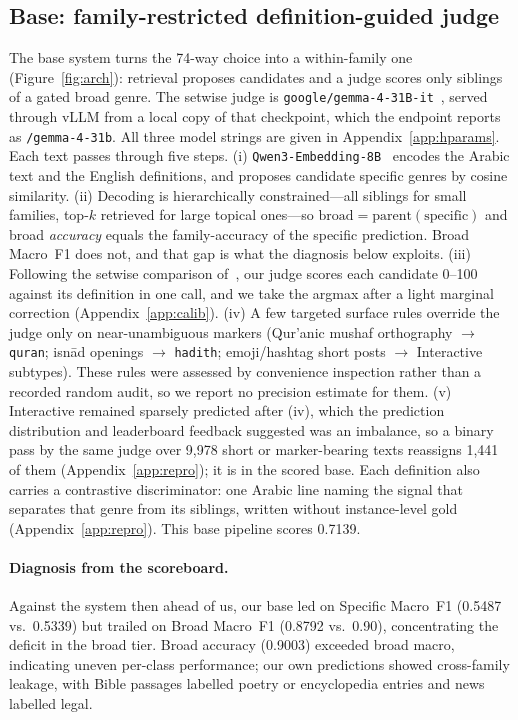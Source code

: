 \documentclass[11pt]{article}
\begin{document}
\subsection{Base: family-restricted definition-guided judge}
The base system turns the 74-way choice into a within-family one (Figure~\ref{fig:arch}):
retrieval proposes candidates and a judge scores only siblings of a gated broad genre. The
setwise judge is \texttt{google/gemma-4-31B-it}~\citep{gemma4_2026}, served through vLLM from a
local copy of that checkpoint, which the endpoint reports as \texttt{/gemma-4-31b}. All three
model strings are given in Appendix~\ref{app:hparams}. Each text passes through five steps.
(i) \texttt{Qwen3-Embedding-8B}~\citep{qwen3embedding2025} encodes the Arabic text and the
English definitions, and proposes candidate specific genres by cosine similarity.
(ii) Decoding is hierarchically constrained---all siblings for small families, top-$k$ retrieved
for large topical ones---so $\text{broad}=\text{parent}(\text{specific})$ and broad
\emph{accuracy} equals the family-accuracy of the specific prediction. Broad Macro~F1 does not,
and that gap is what the diagnosis below exploits. (iii) Following the setwise comparison of~\citet{sun2023rankgpt}, our judge scores each
candidate 0--100 against its definition in one call, and we take the argmax after a light marginal correction
(Appendix~\ref{app:calib}). (iv) A few
targeted surface rules override the judge only on near-unambiguous markers
(Qur'anic mushaf orthography $\rightarrow$ \texttt{quran}; isn\=ad
openings $\rightarrow$ \texttt{hadith}; emoji/hashtag short posts $\rightarrow$ Interactive
subtypes). These rules were assessed by convenience inspection rather than a
recorded random audit, so we report no precision estimate for them. (v) Interactive remained sparsely
predicted after (iv), which the prediction distribution and leaderboard feedback suggested was an
imbalance, so a binary pass by the same judge over 9{,}978 short or marker-bearing texts reassigns
1{,}441 of them (Appendix~\ref{app:repro}); it is in the scored base. Each definition also carries a contrastive
discriminator: one Arabic line naming the signal that separates that genre from its siblings,
written without instance-level gold (Appendix~\ref{app:repro}). This base pipeline scores 0.7139.

\paragraph{Diagnosis from the scoreboard.}
Against the system then ahead of us, our base led on Specific Macro~F1 (0.5487 vs.\ 0.5339) but
trailed on Broad Macro~F1 (0.8792 vs.\ 0.90), concentrating the deficit in the broad tier. Broad
accuracy (0.9003) exceeded broad macro, indicating uneven per-class performance; our own
predictions showed cross-family leakage, with Bible passages labelled poetry or encyclopedia
entries and news labelled legal.
\end{document}
